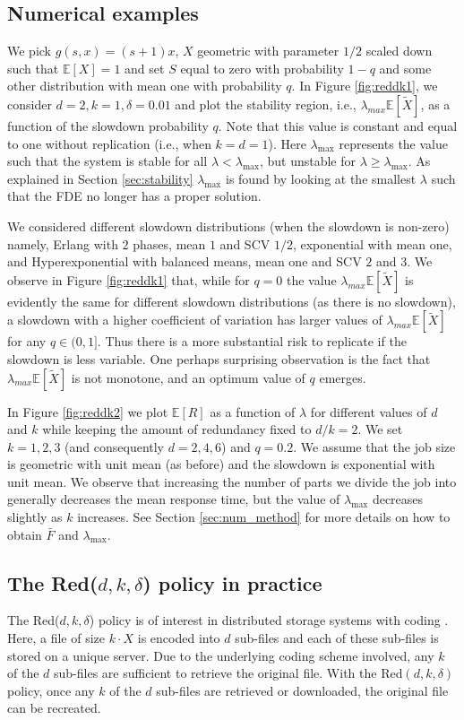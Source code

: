 \documentclass[12pt]{report}
\newcommand{\E}{\mathbb{E}}
\begin{document}
\subsection*{Numerical examples}
We pick $g(s,x)=(s+1)x$, $X$ geometric with parameter $1/2$ scaled down such that $\E[X]=1$ and set $S$ equal to zero with probability $1-q$ and some other distribution with mean one with probability $q$. In Figure \ref{fig:reddk1}, we consider $d=2, k=1, \delta=0.01$ and plot the stability region, i.e.,
$\lambda_{max}\E[\tilde{X}]$, as a function of the slowdown probability $q$. Note that this value is constant and equal to one without replication (i.e., when $k=d=1$). Here $\lambda_{\max}$ represents the value such that the system is stable for all $\lambda < \lambda_{\max}$, but unstable for $\lambda \geq \lambda_{\max}$. As explained in Section \ref{sec:stability} $\lambda_{\max}$ is found by looking at
the smallest $\lambda$ such that the FDE no longer has a proper solution.

We considered different slowdown distributions (when the slowdown is non-zero) namely, Erlang with $2$ phases, mean $1$ and SCV $1/2$, exponential with mean one, and Hyperexponential with balanced means, mean one and SCV $2$ and $3$. We observe in Figure \ref{fig:reddk1} that, while for $q=0$ the value $\lambda_{max}\E[\tilde{X}]$ is evidently the same for different slowdown distributions (as there is no slowdown), a slowdown with a higher coefficient of variation has larger values of  $\lambda_{max}\E[\tilde{X}]$ for any $q \in (0,1]$. Thus there
is a more substantial risk to replicate if the slowdown is less variable.
One perhaps surprising observation is the fact that $\lambda_{max}\E[\tilde{X}]$  is not monotone, and an optimum value of $q$ emerges. 

In Figure \ref{fig:reddk2} we plot  $\E[R]$ as a function of $\lambda$ for different values of 
$d$ and $k$ while keeping the amount of redundancy fixed to $d/k=2$. We set $k=1,2,3$ (and consequently $d=2,4,6$) and $q=0.2$. We assume that the job size is geometric with unit mean (as before) and the slowdown is exponential with unit mean. We observe that increasing the number of parts we divide the job into generally decreases the mean response time, but the value of $\lambda_{\max}$ decreases slightly as $k$ increases. See Section \ref{sec:num_method} for more details on how to obtain $\bar F$ and $\lambda_{\max}$.

\subsection*{The Red($d,k,\delta$) policy in practice}
The Red($d,k,\delta$) policy is of interest in distributed storage systems with coding \cite{Joshi12,Shah16,Shah17,Joshi17}. Here, a file of size $k\cdot X$ is encoded into $d$ sub-files and each of these sub-files is stored on a unique server. Due to the underlying coding scheme involved, any $k$ of the $d$ sub-files are sufficient to retrieve the original file. With the Red$(d,k,\delta)$ policy, once any $k$ of the $d$ sub-files are retrieved or downloaded, the original file can be recreated. 
\end{document}
